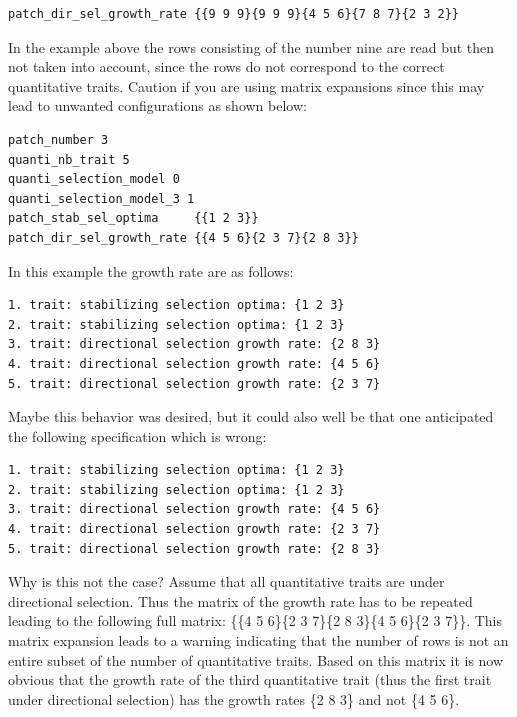 \documentclass[letterpaper,12pt,oneside]{book}
\begin{document}
\begin{appendices}
\begin{lstlisting}[frame=single]
patch_dir_sel_growth_rate {{9 9 9}{9 9 9}{4 5 6}{7 8 7}{2 3 2}}
\end{lstlisting}
In the example above the rows consisting of the number nine are read but then not taken into account, since the rows do not correspond to the correct quantitative traits. Caution if you are using matrix expansions since this may lead to unwanted configurations as shown below:
\begin{lstlisting}[frame=single]
patch_number 3
quanti_nb_trait 5 
quanti_selection_model 0	
quanti_selection_model_3 1
patch_stab_sel_optima     {{1 2 3}}
patch_dir_sel_growth_rate {{4 5 6}{2 3 7}{2 8 3}}
\end{lstlisting}
In this example the growth rate are as follows:
\begin{lstlisting}[frame=single]
1. trait: stabilizing selection optima: {1 2 3}
2. trait: stabilizing selection optima: {1 2 3}
3. trait: directional selection growth rate: {2 8 3}
4. trait: directional selection growth rate: {4 5 6}
5. trait: directional selection growth rate: {2 3 7}
\end{lstlisting}
Maybe this behavior was desired, but it could also well be that one anticipated the following specification which is wrong:
\begin{lstlisting}[frame=single]
1. trait: stabilizing selection optima: {1 2 3}
2. trait: stabilizing selection optima: {1 2 3}
3. trait: directional selection growth rate: {4 5 6}
4. trait: directional selection growth rate: {2 3 7}
5. trait: directional selection growth rate: {2 8 3}
\end{lstlisting}
Why is this not the case? Assume that all quantitative traits are under directional selection. Thus the matrix of the growth rate has to be repeated leading to the following full matrix: \{\{4 5 6\}\{2 3 7\}\{2 8 3\}\{4 5 6\}\{2 3 7\}\}. This matrix expansion leads to a warning indicating that the number of rows is not an entire subset of the number of quantitative traits. Based on this matrix it is now obvious that the growth rate of the third quantitative trait (thus the first trait under directional selection) has the growth rates \{2 8 3\} and not \{4 5 6\}.


\end{appendices}
\end{document}
